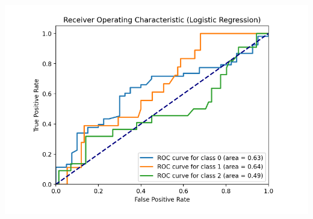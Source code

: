 \documentclass{article}
\begin{document}
\includegraphics[width=1.0\linewidth]{tab1_logistic_regression3.png}
\end{document}
